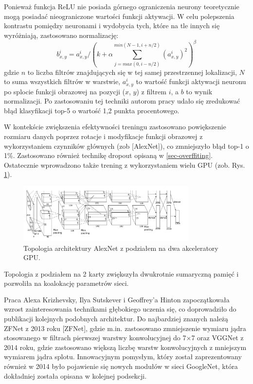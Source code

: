 Ponieważ funkcja ReLU nie posiada górnego ograniczenia neurony teoretycznie mogą posiadać nieograniczone wartości funkcji aktywacji. W celu polepszenia kontrastu pomiędzy neuronami i wydobycia tych, które na tle innych się wyróżniają, zastosowano normalizację:
\begin{equation}
b^i_{x,y} = a^i_{x,y}/\left ( k + \alpha \sum_{j=max(0,i-n/2)}^{min(N-1,i+n/2)} (a^i_{x,y})^2 \right  )^\beta 
\label{AlexNetNorm}
\end{equation}
gdzie $n$ to liczba filtrów znajdujących się w tej samej przestrzennej lokalizacji, $N$ to suma wszystkich filtrów w warstwie, $a^i_{x,y}$ to wartość funkcji aktywacji neuronu po splocie funkcji obrazowej na pozycji ($x$, $y$) z filtrem $i$, a $b$ to wynik normalizacji. Po zastosowaniu tej techniki autorom pracy udało się zredukować błąd klasyfikacji top-5 o wartość 1,2 punkta procentowego.

W kontekście zwiększenia efektywności treningu zastosowano powiększenie rozmiaru danych poprzez rotacje i modyfikacje funkcji obrazowej z wykorzystaniem czynników głównych (zob [AlexNet]), co zmniejszyło błąd top-1 o 1\%. Zastosowano również technikę dropout opisaną w \ref{sec-overffiting}. Ostatecznie wprowadzono także trening z wykorzystaniem wielu GPU (zob. Rys. \ref{AlexNetTopologyMultiGPU}). 

\begin{figure}[h!]
	\centering
	\includegraphics[width=0.8\textwidth]{figures/AlexNet-multiGPU.png}
	\caption{Topologia architektury AlexNet z podziałem na dwa akceleratory GPU.}
	\label{AlexNetTopologyMultiGPU}
\end{figure}

Topologia z podziałem na 2 karty zwiększyła dwukrotnie sumaryczną pamięć i pozwoliła na koalokację parametrów sieci.

Praca Alexa Krizhevsky, Ilya Sutskever i Geoffrey'a Hinton zapoczątkowała wzrost zainteresowania technikami głębokiego uczenia się, co doprowadziło do publikacji kolejnych podobnych architektur. Do najbardziej znanych należą ZFNet z 2013 roku [ZFNet], gdzie m.in. zastosowano zmniejszenie wymiaru jądra stosowanego w filtrach pierwszej warstwy konwolucyjnej do 7$\times$7 oraz VGGNet z 2014 roku, gdzie zastosowano większą liczbę warstw konwolucyjnych z mniejszym wymiarem jądra splotu. Innowacyjnym pomysłym, który został zaprezentowany również w 2014 było pojawienie się nowych modułów w sieci GoogleNet, która dokładniej została opisana w kolejnej podsekcji.


